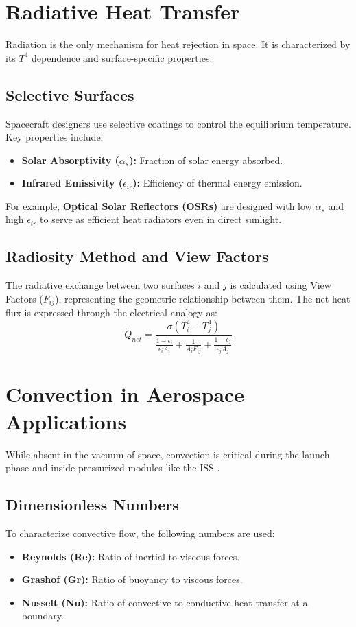 \documentclass[12pt,a4paper]{report}
\begin{document}
\section{Radiative Heat Transfer}
Radiation is the only mechanism for heat rejection in space. It is characterized by its $T^4$ dependence and surface-specific properties.

\subsection{Selective Surfaces}
Spacecraft designers use selective coatings to control the equilibrium temperature. Key properties include:
\begin{itemize}
    \item \textbf{Solar Absorptivity ($\alpha_s$):} Fraction of solar energy absorbed.
    \item \textbf{Infrared Emissivity ($\epsilon_{ir}$):} Efficiency of thermal energy emission.
\end{itemize}
For example, \textbf{Optical Solar Reflectors (OSRs)} are designed with low $\alpha_s$ and high $\epsilon_{ir}$ to serve as efficient heat radiators even in direct sunlight.

\subsection{Radiosity Method and View Factors}
The radiative exchange between two surfaces $i$ and $j$ is calculated using View Factors ($F_{ij}$), representing the geometric relationship between them. The net heat flux is expressed through the electrical analogy as:
\begin{equation}
    \dot{Q}_{net} = \frac{\sigma(T_i^4 - T_j^4)}{\frac{1-\epsilon_i}{\epsilon_i A_i} + \frac{1}{A_i F_{ij}} + \frac{1-\epsilon_j}{\epsilon_j A_j}}
\end{equation}

\section{Convection in Aerospace Applications}
While absent in the vacuum of space, convection is critical during the launch phase and inside pressurized modules like the ISS \cite{Convection_PDF}.

\subsection{Dimensionless Numbers}
To characterize convective flow, the following numbers are used:
\begin{itemize}
    \item \textbf{Reynolds (Re):} Ratio of inertial to viscous forces.
    \item \textbf{Grashof (Gr):} Ratio of buoyancy to viscous forces.
    \item \textbf{Nusselt (Nu):} Ratio of convective to conductive heat transfer at a boundary.
\end{itemize}
\end{document}
